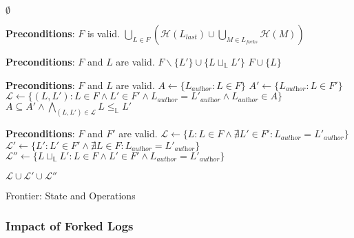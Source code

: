 \documentclass[9pt, oneside]{article}   	%
\begin{document}
\begin{algorithm}
\begin{algorithmic}[1]
		\State \Return $\emptyset$ 
	\EndFunction
	\State
	
		
	 
		\State \textbf{Preconditions}: $F$ is valid.
		\State
		\State \Return $\bigcup\limits_{L \in F} (\mathcal{H}(L_\textit{last}) \cup \bigcup\limits_{M \in L_\textit{forks}} \mathcal{H}(M))$ 
	\EndFunction
	\State	
	
		\State \textbf{Preconditions}: $F$ and $L$ are valid.
		\State
			\State \Return $F \backslash \{ L' \} \cup \{ L \sqcup_\mathds{L} L' \}$
		\Else
			\State \Return $F \cup \{ L \}$
		\EndIf
	\EndFunction
	\State
	
		\State \textbf{Preconditions}: $F$ and $L$ are valid.
		\State
		\State $A \leftarrow \{ L_\textit{author} : L \in F \}$
		\State $A' \leftarrow \{ L_\textit{author} : L \in F' \}$
		\State $\mathcal{L} \leftarrow \{ (L, L') : L \in F \wedge L' \in F' \wedge L_\textit{author} = L'_\textit{author} \wedge L_\textit{author} \in A \}$
		\State \Return $A \subseteq A' \wedge  \bigwedge\limits_{(L,L') \in \mathcal{L}} L \leq_\mathds{L} L'$
	\EndFunction
	\State
	
		\State \textbf{Preconditions}: $F$ and $F'$ are valid.
		\State
		\State $\mathcal{L} \leftarrow \{ L : L \in F \wedge \nexists L' \in F' : L_\textit{author} = L'_\textit{author} \}$
		\State $\mathcal{L}' \leftarrow \{ L' : L' \in F' \wedge \nexists L \in F : L_\textit{author} = L'_\textit{author} \}$
		\State $\mathcal{L}'' \leftarrow \{ L \sqcup_\mathds{L} L' : L \in F \wedge L' \in F' \wedge L_\textit{author} = L'_\textit{author} \}$
		
		\State \Return $\mathcal{L} \cup \mathcal{L'} \cup \mathcal{L}''$
	\EndFunction
\end{algorithmic}
\caption{\label{alg:frontier} Frontier: State and Operations}
\end{algorithm}

\subsubsection{Impact of Forked Logs}
\end{document}
